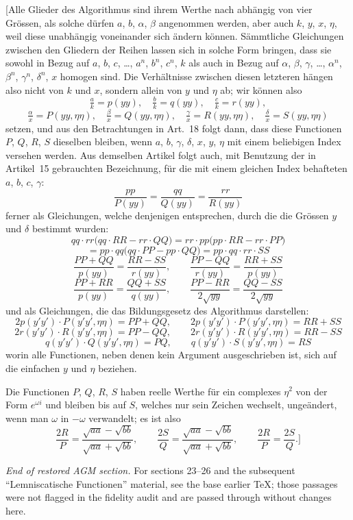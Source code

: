 \documentclass[10pt,a4paper]{article}
\begin{document}
[Alle Glieder des Algorithmus sind ihrem Werthe nach abh\"angig von vier
Gr\"ossen, als solche d\"urfen $a$, $b$, $\alpha$, $\beta$ angenommen werden,
aber auch $k$, $y$, $x$, $\eta$, weil diese unabh\"angig voneinander sich
\"andern k\"onnen. S\"ammtliche Gleichungen zwischen den Gliedern der Reihen
lassen sich in solche Form bringen, dass sie sowohl in Bezug auf $a$, $b$,
$c$, \ldots, $a^n$, $b^n$, $c^n$, $k$ als auch in Bezug auf $\alpha$, $\beta$,
$\gamma$, \ldots, $\alpha^n$, $\beta^n$, $\gamma^n$, $\delta^n$, $x$ homogen
sind. Die Verh\"altnisse zwischen diesen letzteren h\"angen also nicht von
$k$ und $x$, sondern allein von $y$ und $\eta$ ab; wir k\"onnen also
\[
\tfrac{a}{k} = p(yy), \quad \tfrac{b}{k} = q(yy), \quad \tfrac{c}{k} = r(yy),
\]
\[
\tfrac{\alpha}{x} = P(yy,\eta\eta), \quad \tfrac{\beta}{x} = Q(yy,\eta\eta),
\quad \tfrac{\gamma}{x} = R(yy,\eta\eta), \quad \tfrac{\delta}{x} = S(yy,\eta\eta)
\]
setzen, und aus den Betrachtungen in Art.~18 folgt dann, dass diese
Functionen $P$, $Q$, $R$, $S$ dieselben bleiben, wenn $a$, $b$, $\gamma$,
$\delta$, $x$, $y$, $\eta$ mit einem beliebigen Index versehen werden.
Aus demselben Artikel folgt auch, mit Benutzung der in Artikel~15 gebrauchten
Bezeichnung, f\"ur die mit einem gleichen Index behafteten $a$, $b$, $c$,
$\gamma$:
\[
\frac{pp}{P(yy)} = \frac{qq}{Q(yy)} = \frac{rr}{R(yy)}
\]
ferner als Gleichungen, welche denjenigen entsprechen, durch die die Gr\"ossen
$y$ und $\delta$ bestimmt wurden:
\[
qq\cdot rr\bigl(qq\cdot RR - rr\cdot QQ\bigr)
 = rr\cdot pp\bigl(pp\cdot RR - rr\cdot PP\bigr)
\]
\[
 = pp\cdot qq\bigl(qq\cdot PP - pp\cdot QQ\bigr)
 = pp\cdot qq\cdot rr\cdot SS
\]
\[
\frac{PP + QQ}{p(yy)} = \frac{RR - SS}{r(yy)},
\qquad
\frac{PP - QQ}{r(yy)} = \frac{RR + SS}{p(yy)}
\]
\[
\frac{PP + RR}{p(yy)} = \frac{QQ + SS}{q(yy)},
\qquad
\frac{PP - RR}{2\sqrt{yy}} = \frac{QQ - SS}{2\sqrt{yy}}
\]
und als Gleichungen, die das Bildungsgesetz des Algorithmus darstellen:
\[
2p(y'y')\cdot P(y'y',\eta\eta) = PP + QQ, \qquad
2p(y'y')\cdot P(y'y',\eta\eta) = RR + SS
\]
\[
2r(y'y')\cdot R(y'y',\eta\eta) = PP - QQ, \qquad
2r(y'y')\cdot R(y'y',\eta\eta) = RR - SS
\]
\[
q(y'y')\cdot Q(y'y',\eta\eta) = PQ, \qquad
q(y'y')\cdot S(y'y',\eta\eta) = RS
\]
worin alle Functionen, neben denen kein Argument ausgeschrieben ist, sich
auf die einfachen $y$ und $\eta$ beziehen.

Die Functionen $P$, $Q$, $R$, $S$ haben reelle Werthe f\"ur ein complexes
$\eta^2$ von der Form $e^{\omega i}$ und bleiben bis auf $S$, welches nur
sein Zeichen wechselt, unge\"andert, wenn man $\omega$ in $-\omega$ verwandelt;
es ist also
\[
\frac{2R}{P} = \frac{\sqrt{aa}-\sqrt{bb}}{\sqrt{aa}+\sqrt{bb}}, \qquad
\frac{2S}{Q} = \frac{\sqrt{aa}-\sqrt{bb}}{\sqrt{aa}+\sqrt{bb}}, \qquad
\frac{2R}{P} = \frac{2S}{Q}.\Bigr]
\]

\vspace{2em}

\noindent\hrulefill

\vspace{1em}

\noindent\textit{End of restored AGM section.} For sections 23--26 and the
subsequent ``Lemniscatische Functionen'' material, see the base earlier TeX;
those passages were not flagged in the fidelity audit and are passed through
without changes here.
\end{document}
